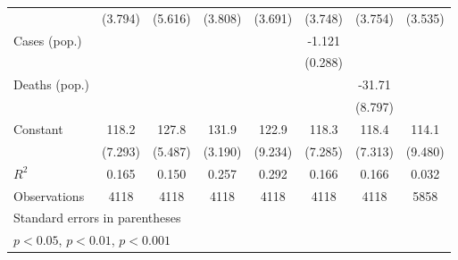 \documentclass{article}
\begin{document}
{\begin{longtable}{l*{7}{c}}
                &  (3.794)         &  (5.616)         &  (3.808)         &  (3.691)         &  (3.748)         &  (3.754)         &  (3.535)         \\
Cases (pop.)    &                  &                  &                  &                  &   -1.121\sym{***}&                  &                  \\
                &                  &                  &                  &                  &  (0.288)         &                  &                  \\
Deaths (pop.)   &                  &                  &                  &                  &                  &   -31.71\sym{**} &                  \\
                &                  &                  &                  &                  &                  &  (8.797)         &                  \\
Constant        &    118.2\sym{***}&    127.8\sym{***}&    131.9\sym{***}&    122.9\sym{***}&    118.3\sym{***}&    118.4\sym{***}&    114.1\sym{***}\\
                &  (7.293)         &  (5.487)         &  (3.190)         &  (9.234)         &  (7.285)         &  (7.313)         &  (9.480)         \\
\hline
\(R^{2}\)       &    0.165         &    0.150         &    0.257         &    0.292         &    0.166         &    0.166         &    0.032         \\
Observations    &     4118         &     4118         &     4118         &     4118         &     4118         &     4118         &     5858         \\
\hline\hline
\multicolumn{8}{l}{\footnotesize Standard errors in parentheses}\\
\multicolumn{8}{l}{\footnotesize \sym{*} \(p<0.05\), \sym{**} \(p<0.01\), \sym{***} \(p<0.001\)}\\
\end{longtable}
}
\end{document}
